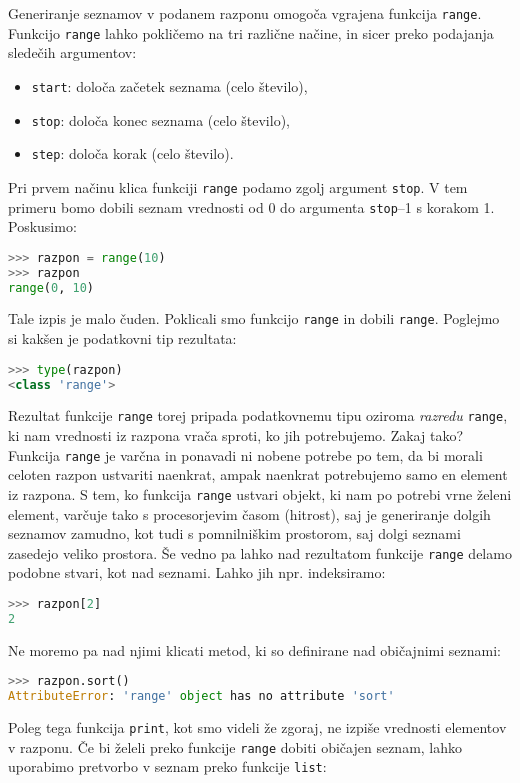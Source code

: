 Generiranje seznamov v podanem razponu omogoča vgrajena funkcija \texttt{range}. Funkcijo \texttt{range} lahko pokličemo na tri različne načine, in sicer preko podajanja sledečih argumentov:
\begin{itemize}
\item \texttt{start}: določa začetek seznama (celo število),
\item \texttt{stop}: določa konec seznama (celo število),
\item \texttt{step}: določa korak (celo število).
\end{itemize}

Pri prvem načinu klica funkciji \texttt{range} podamo zgolj argument \texttt{stop}. V tem primeru bomo dobili seznam vrednosti od 0 do argumenta \texttt{stop}--1 s korakom 1. Poskusimo:
\begin{lstlisting}[language=Python]
>>> razpon = range(10)
>>> razpon
range(0, 10)
\end{lstlisting}
Tale izpis je malo čuden. Poklicali smo funkcijo \texttt{range} in dobili \texttt{range}. Poglejmo si kakšen je podatkovni tip rezultata:
\begin{lstlisting}[language=Python]
>>> type(razpon)
<class 'range'>
\end{lstlisting}
Rezultat funkcije \texttt{range} torej pripada podatkovnemu tipu oziroma \emph{razredu} \texttt{range}, ki nam vrednosti iz razpona vrača sproti, ko jih potrebujemo. Zakaj tako? Funkcija \texttt{range} je varčna in ponavadi ni nobene potrebe po tem, da bi morali celoten razpon ustvariti naenkrat, ampak naenkrat potrebujemo samo en element iz razpona. S tem, ko funkcija \texttt{range} ustvari objekt, ki nam po potrebi vrne želeni element, varčuje tako s procesorjevim časom (hitrost), saj je generiranje dolgih seznamov zamudno, kot tudi s pomnilniškim prostorom, saj dolgi seznami zasedejo veliko prostora. Še vedno pa lahko nad rezultatom funkcije \texttt{range} delamo podobne stvari, kot nad seznami. Lahko jih npr. indeksiramo:
\begin{lstlisting}[language=Python]
>>> razpon[2]
2
\end{lstlisting}
Ne moremo pa nad njimi klicati metod, ki so definirane nad običajnimi seznami:
\begin{lstlisting}[language=Python]
>>> razpon.sort()
AttributeError: 'range' object has no attribute 'sort'
\end{lstlisting}
Poleg tega funkcija \texttt{print}, kot smo videli že zgoraj, ne izpiše vrednosti elementov v razponu. Če bi želeli preko funkcije \texttt{range} dobiti običajen seznam, lahko uporabimo pretvorbo v seznam preko funkcije \texttt{list}:
